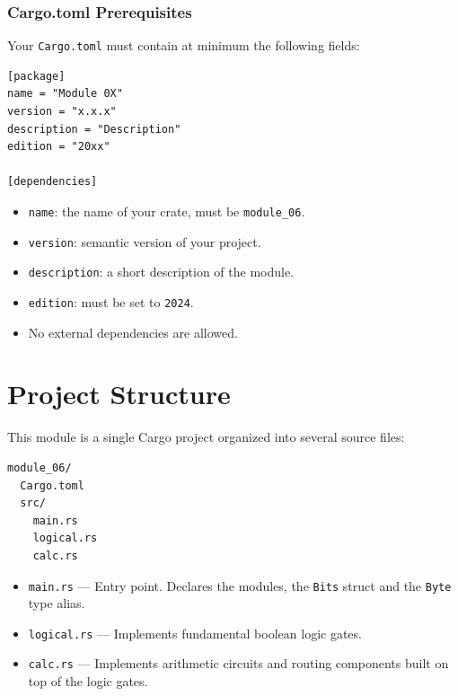 \documentclass[a4paper,12pt]{report}
\begin{document}
\vspace{0.5cm}

\subsection*{Cargo.toml Prerequisites}

Your \texttt{Cargo.toml} must contain at minimum the following fields:

\vspace{0.8cm}

\begin{lstlisting}
[package]
name = "Module 0X"
version = "x.x.x"
description = "Description"
edition = "20xx"

[dependencies]
\end{lstlisting}

\begin{itemize}[leftmargin=1.5em, itemsep=0.5em]
    \item \texttt{name}: the name of your crate, must be \texttt{module\_06}.
    \item \texttt{version}: semantic version of your project.
    \item \texttt{description}: a short description of the module.
    \item \texttt{edition}: must be set to \texttt{2024}.
    \item No external dependencies are allowed.
\end{itemize}

\newpage

\chapter{Project Structure}

This module is a single Cargo project organized into several source files:

\begin{lstlisting}
module_06/
  Cargo.toml
  src/
    main.rs
    logical.rs
    calc.rs
\end{lstlisting}

\begin{itemize}[leftmargin=1.5em, itemsep=0.5em]
    \item \texttt{main.rs} — Entry point. Declares the modules, the \texttt{Bits} struct and the \texttt{Byte} type alias.
    \item \texttt{logical.rs} — Implements fundamental boolean logic gates.
    \item \texttt{calc.rs} — Implements arithmetic circuits and routing components built on top of the logic gates.
\end{itemize}
\end{document}

